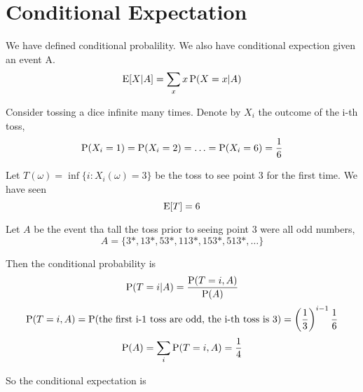 \section{Conditional Expectation}
We have defined conditional probalility. We also have conditional expection given an event A.
$$\E[X|A] = \sum_x x\P(X=x | A)$$
\begin{exmp}{}
Consider tossing a dice infinite many times. Denote by $X_i$ the outcome of the i-th toss,
$$\P(X_i = 1) = \P(X_i = 2) = \ldots =\P(X_i = 6) = \frac{1}{6}$$

Let $T(\omega)=\inf \{i: X_i(\omega) = 3\}$ be the toss to see point 3 for the first time. We have seen
$$\E[T] = 6$$

Let $A$ be the event tha tall the toss prior to seeing point 3 were all odd numbers,
$$A=\{3*, 13*, 53*, 113*, 153*, 513*,\ldots\}$$

Then the conditional probability is 
$$\P(T=i | A) = \frac{\P(T = i, A)}{\P(A)}$$
$$\P(T=i, A) = \P(\textrm{the first i-1 toss are odd, the i-th toss is 3}) = \left( \frac{1}{3} \right)^{i-1} \frac{1}{6}$$
$$\P(A) = \sum_i \P(T=i, A) =\frac{1}{4}$$

So the conditional expectation is 
\end{exmp}



